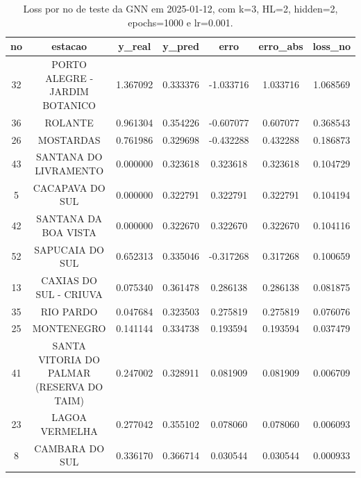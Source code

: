 \begin{table}[h]
\centering
\caption{Loss por no de teste da GNN em 2025-01-12, com k=3, HL=2, hidden=2, epochs=1000 e lr=0.001.}
\label{tab:gnn_loss_k3_hl2_h2_e1000_d20250112}
\begin{tabular}{ccccccc}
\toprule
no & estacao & y\_real & y\_pred & erro & erro\_abs & loss\_no \\
\midrule
32 & PORTO ALEGRE - JARDIM BOTANICO & 1.367092 & 0.333376 & -1.033716 & 1.033716 & 1.068569 \\
36 & ROLANTE & 0.961304 & 0.354226 & -0.607077 & 0.607077 & 0.368543 \\
26 & MOSTARDAS & 0.761986 & 0.329698 & -0.432288 & 0.432288 & 0.186873 \\
43 & SANTANA DO LIVRAMENTO & 0.000000 & 0.323618 & 0.323618 & 0.323618 & 0.104729 \\
5 & CACAPAVA DO SUL & 0.000000 & 0.322791 & 0.322791 & 0.322791 & 0.104194 \\
42 & SANTANA DA BOA VISTA & 0.000000 & 0.322670 & 0.322670 & 0.322670 & 0.104116 \\
52 & SAPUCAIA DO SUL & 0.652313 & 0.335046 & -0.317268 & 0.317268 & 0.100659 \\
13 & CAXIAS DO SUL - CRIUVA & 0.075340 & 0.361478 & 0.286138 & 0.286138 & 0.081875 \\
35 & RIO PARDO & 0.047684 & 0.323503 & 0.275819 & 0.275819 & 0.076076 \\
25 & MONTENEGRO & 0.141144 & 0.334738 & 0.193594 & 0.193594 & 0.037479 \\
41 & SANTA VITORIA DO PALMAR (RESERVA DO TAIM) & 0.247002 & 0.328911 & 0.081909 & 0.081909 & 0.006709 \\
23 & LAGOA VERMELHA & 0.277042 & 0.355102 & 0.078060 & 0.078060 & 0.006093 \\
8 & CAMBARA DO SUL & 0.336170 & 0.366714 & 0.030544 & 0.030544 & 0.000933 \\
\bottomrule
\end{tabular}
\end{table}
